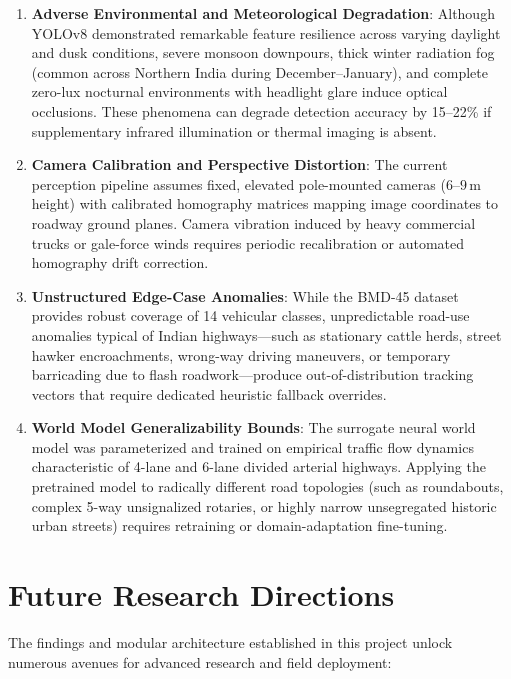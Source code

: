 \documentclass[12pt,a4paper,oneside]{report}
\begin{document}
\begin{enumerate}
    \item \textbf{Adverse Environmental and Meteorological Degradation}: Although YOLOv8 demonstrated remarkable feature resilience across varying daylight and dusk conditions, severe monsoon downpours, thick winter radiation fog (common across Northern India during December--January), and complete zero-lux nocturnal environments with headlight glare induce optical occlusions. These phenomena can degrade detection accuracy by 15--22\% if supplementary infrared illumination or thermal imaging is absent.
    
    \item \textbf{Camera Calibration and Perspective Distortion}: The current perception pipeline assumes fixed, elevated pole-mounted cameras ($6\text{--}9$\,m height) with calibrated homography matrices mapping image coordinates to roadway ground planes. Camera vibration induced by heavy commercial trucks or gale-force winds requires periodic recalibration or automated homography drift correction.
    
    \item \textbf{Unstructured Edge-Case Anomalies}: While the BMD-45 dataset provides robust coverage of 14 vehicular classes, unpredictable road-use anomalies typical of Indian highways—such as stationary cattle herds, street hawker encroachments, wrong-way driving maneuvers, or temporary barricading due to flash roadwork—produce out-of-distribution tracking vectors that require dedicated heuristic fallback overrides.
    
    \item \textbf{World Model Generalizability Bounds}: The surrogate neural world model was parameterized and trained on empirical traffic flow dynamics characteristic of 4-lane and 6-lane divided arterial highways. Applying the pretrained model to radically different road topologies (such as roundabouts, complex 5-way unsignalized rotaries, or highly narrow unsegregated historic urban streets) requires retraining or domain-adaptation fine-tuning.
\end{enumerate}

\section{Future Research Directions}
\label{sec:future_work}
The findings and modular architecture established in this project unlock numerous avenues for advanced research and field deployment:
\end{document}
